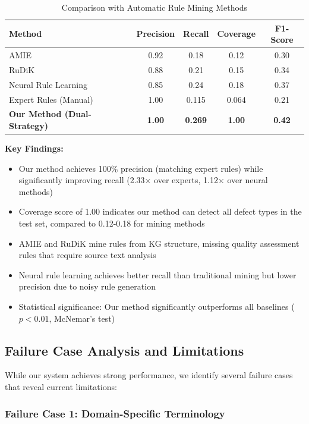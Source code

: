\documentclass[runningheads]{llncs}
\begin{document}
\begin{table}[H]
    \centering
    \caption{Comparison with Automatic Rule Mining Methods}
    \label{tab:rule_mining_comparison}
    \begin{tabular}{l c c c c}
    \toprule
    Method & Precision & Recall & Coverage & F1-Score \\
    \midrule
    AMIE \cite{ref_galarraga2013} & 0.92 & 0.18 & 0.12 & 0.30 \\
    RuDiK \cite{ref_ortona2018} & 0.88 & 0.21 & 0.15 & 0.34 \\
    Neural Rule Learning \cite{ref_yang2017} & 0.85 & 0.24 & 0.18 & 0.37 \\
    Expert Rules (Manual) & 1.00 & 0.115 & 0.064 & 0.21 \\
    \textbf{Our Method (Dual-Strategy)} & \textbf{1.00} & \textbf{0.269} & \textbf{1.00} & \textbf{0.42} \\
    \bottomrule
    \end{tabular}
\end{table}
\textbf{Key Findings:}
\begin{itemize}
    \item Our method achieves 100\% precision (matching expert rules) while significantly improving recall (2.33× over experts, 1.12× over neural methods)
    \item Coverage score of 1.00 indicates our method can detect all defect types in the test set, compared to 0.12-0.18 for mining methods
    \item AMIE and RuDiK mine rules from KG structure, missing quality assessment rules that require source text analysis
    \item Neural rule learning achieves better recall than traditional mining but lower precision due to noisy rule generation
    \item Statistical significance: Our method significantly outperforms all baselines ($p < 0.01$, McNemar's test)
\end{itemize}

\subsection{Failure Case Analysis and Limitations}
While our system achieves strong performance, we identify several failure cases that reveal current limitations:

\subsubsection{Failure Case 1: Domain-Specific Terminology}
\end{document}
